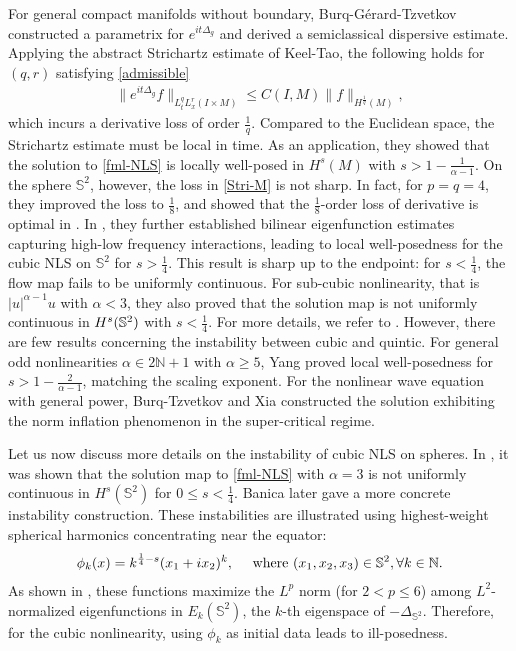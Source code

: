 \documentclass[11pt, reqno]{amsart}
\numberwithin{equation}{section}
\newcommand{\N}{\mathbb N}
\theoremstyle{definition}
\theoremstyle{remark}
\begin{document}
For general compact manifolds without boundary, Burq-G\'erard-Tzvetkov \cite{Burq1} constructed a parametrix for $e^{it\Delta_g}$ and derived a semiclassical dispersive estimate. Applying the abstract Strichartz estimate of Keel-Tao, the following holds for $(q,r)$ satisfying \eqref{admissible}
\begin{align}\label{Stri-M}
\big\|e^{it\Delta_g}f\big\|_{L_t^qL_x^r(I\times M)}\leq C(I,M)\|f\|_{H^\frac1q(M)}, 
\end{align} 
which incurs a derivative loss of order $\frac1q$. Compared to the Euclidean space, the Strichartz estimate must be local in time. As an application, they showed that the solution to \eqref{fml-NLS} is locally well-posed in $H^s(M)$ with $s>1-\frac{1}{\alpha-1}$.  On the sphere $\mathbb{S}^2$, however, the loss in \eqref{Stri-M} is not  sharp. In fact, for $p = q = 4$, they improved the loss to $\frac18$, and showed that the $\frac{1}{8}$-order  loss of derivative is optimal in \cite{Burq1}. In \cite{Burq2}, they further established bilinear eigenfunction estimates capturing high-low frequency interactions, leading to local well-posedness for the cubic NLS on $\mathbb{S}^2$ for $s > \frac14$. This 
result is sharp up to the endpoint: for $s < \frac14$, the flow map fails to be uniformly continuous. For sub-cubic nonlinearity, that is $|u|^{\alpha-1}u$ with $\alpha<3$, they also proved that the solution map is not uniformly continuous in $H^s(\Bbb S^2)$ with $s<\frac{1}{4}$. For more details, we refer to \cite{GerardICM}. However, there are few results concerning the instability between cubic and quintic. For general odd nonlinearities $\alpha \in 2\N+1$ with $\alpha \geq 5$, Yang \cite{Yang} proved local well-posedness for $s > 1 - \frac{2}{\alpha-1}$, matching the scaling exponent. For the nonlinear wave equation with general power, Burq-Tzvetkov \cite{Burq-Tzvektov} and Xia \cite{Xia} constructed the solution exhibiting the norm inflation phenomenon in the super-critical regime. 

	

	
Let us now discuss more details on the instability of cubic NLS on spheres.  In \cite{Burq2001}, it was shown that the solution map to \eqref{fml-NLS}  with $\alpha=3$ is not uniformly continuous in $H^s(\mathbb{S}^2)$ for $0 \leq s < \frac14$. Banica \cite{Banica} later gave a more concrete instability construction. These instabilities are illustrated using highest-weight spherical harmonics concentrating near the equator:
\begin{align}
\phi_k(x)=k^{\frac{1}{4}-s}(x_1+ix_2)^k,\quad\text{ where }(x_1,x_2,x_3)\in\Bbb{S}^2,\forall k\in\Bbb{N}.
\end{align}
As shown in \cite{Han-JGA}, these functions maximize the $L^p$ norm (for $2 < p \le 6$) among $L^2$-normalized eigenfunctions in $E_k(\mathbb{S}^2)$, the $k$-th eigenspace of $-\Delta_{\mathbb{S}^2}$. Therefore, for the cubic nonlinearity,  using $\phi_k$ as initial data leads to ill-posedness.
	
\end{document}
